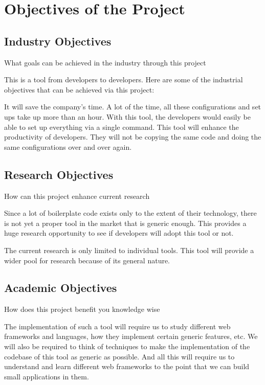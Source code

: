 \section{Objectives of the Project}

\subsection{Industry Objectives}
What goals can be achieved in the industry through this project

This is a tool from developers to developers. Here are some of the industrial objectives that can be achieved via this project:

It will save the company's time. A lot of the time, all these configurations and set ups take up more than an hour. With this tool, the developers would easily be able to set up everything via a single command.
This tool will enhance the productivity of developers. They will not be copying the same code and doing the same configurations over and over again.

\subsection{Research Objectives}
How can this project enhance current research

Since a lot of boilerplate code exists only to the extent of their technology, there is not yet a proper tool in the market that is generic enough. This provides a huge research opportunity to see if developers will adopt this tool or not.

The current research is only limited to individual tools. This tool will provide a wider pool for research because of its general nature.

\subsection{Academic Objectives}
How does this project benefit you knowledge wise

The implementation of such a tool will require us to study different web frameworks and languages, how they implement certain generic features, etc. We will also be required to think of techniques to make the implementation of the codebase of this tool as generic as possible. And all this will require us to understand and learn different web frameworks to the point that we can build small applications in them.
